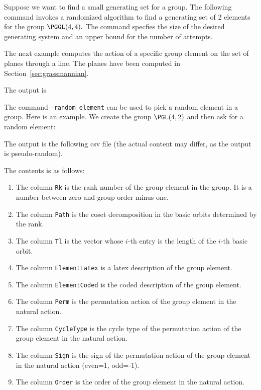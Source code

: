 Suppose we want to find a small generating set for a group. 
The following command invokes a randomized algorithm to find a generating set of 2 elements for the 
group $\PGGL(4,4).$ The command specfies the size of the desired generating system and an upper bound for the number of attempts. 




\bigskip




The next example computes the action of 
a specific group element on the set of planes through a line. 
The planes have been computed in Section~\ref{sec:grassmannian}.


The output is


\bigskip

The command \verb'-random_element' 
can be used to pick a random element in a group.
Here is an example. 
We create the group 
$\PGL(4,2)$ and then ask for a random element:



The output is the following csv file (the actual content may differ, as the output is pseudo-random).


The contents is as follows:
\begin{enumerate}
\item
The column \verb'Rk' is the rank number of the group element in the group. It is a number between zero and group order minus one. 
\item
The column \verb'Path' is the coset decomposition in the basic orbits determined by the rank. 
\item
The column \verb'Tl' is the vector whose $i$-th entry is the length of the $i$-th basic orbit. 
\item
The column \verb'ElementLatex' is a latex description of the group element.
\item
The column \verb'ElementCoded' is the coded description of the group element.
\item
The column \verb'Perm' is the permutation action of the group element in the natural action.
\item
The column \verb'CycleType' is the cycle type of the permutation action of the group element in the natural action.
\item
The column \verb'Sign' is the sign of the permutation action of the group element in the natural action (even=1, odd=-1).
\item
The column \verb'Order' is the order of the group element in the natural action.
\end{enumerate}




